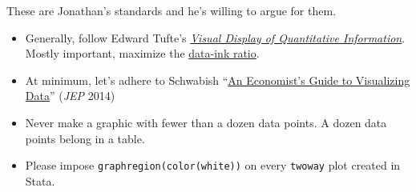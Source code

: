 These are Jonathan's standards and he's willing to argue for them.

\begin{itemize}
	\item Generally, follow Edward Tufte's \href{https://www.edwardtufte.com/tufte/books_vdqi}{\textit{Visual Display of Quantitative Information}}. 
	Mostly important, maximize the \href{https://www.coursera.org/learn/python-plotting/lecture/qFnP9/graphical-heuristics-data-ink-ratio-edward-tufte}{data-ink ratio}.
	\item At minimum, let's adhere to Schwabish ``\href{https://www.aeaweb.org/articles?id=10.1257/jep.28.1.209}{An Economist's Guide to Visualizing Data}'' (\textit{JEP} 2014) 
	\item Never make a graphic with fewer than a dozen data points. A dozen data points belong in a table.
	\item Please impose \texttt{graphregion(color(white))} on every \texttt{twoway} plot created in Stata.
\end{itemize}